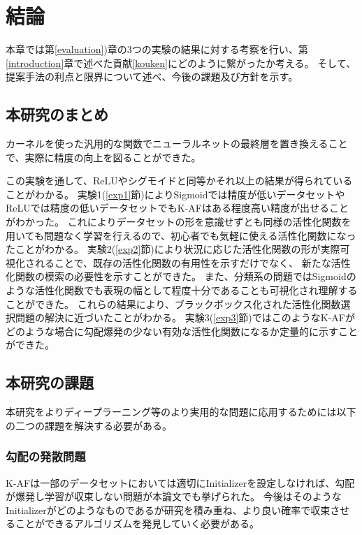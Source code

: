 \chapter{結論}
\label{conclusion}

本章では第\ref{evaluation})章の3つの実験の結果に対する考察を行い、第\ref{introduction}章で述べた貢献\ref{kouken}にどのように繋がったか考える。
そして、提案手法の利点と限界について述べ、今後の課題及び方針を示す。


\section{本研究のまとめ}

カーネルを使った汎用的な関数でニューラルネットの最終層を置き換えることで、実際に精度の向上を図ることができた。

この実験を通して、ReLUやシグモイドと同等かそれ以上の結果が得られていることがわかる。
 実験1(\ref{exp1}節)によりSigmoidでは精度が低いデータセットやReLUでは精度の低いデータセットでもK-AFはある程度高い精度が出せることがわかった。
これによりデータセットの形を意識せずとも同様の活性化関数を用いても問題なく学習を行えるので、初心者でも気軽に使える活性化関数になったことがわかる。
 実験2(\ref{exp2}節)により状況に応じた活性化関数の形が実際可視化されることで、既存の活性化関数の有用性を示すだけでなく、
 新たな活性化関数の模索の必要性を示すことができた。
 また、分類系の問題ではSigmoidのような活性化関数でも表現の幅として程度十分であることも可視化され理解することができた。
これらの結果により、ブラックボックス化された活性化関数選択問題の解決に近づいたことがわかる。
 実験3(\ref{exp3}節)ではこのようなK-AFがどのような場合に勾配爆発の少ない有効な活性化関数になるか定量的に示すことができた。



\section{本研究の課題}
本研究をよりディープラーニング等のより実用的な問題に応用するためには以下の二つの課題を解決する必要がある。

\subsection{勾配の発散問題}
K-AFは一部のデータセットにおいては適切にInitializerを設定しなければ、勾配が爆発し学習が収束しない問題が本論文でも挙げられた。
今後はそのようなInitializerがどのようなものであるが研究を積み重ね、より良い確率で収束させることができるアルゴリズムを発見していく必要がある。

